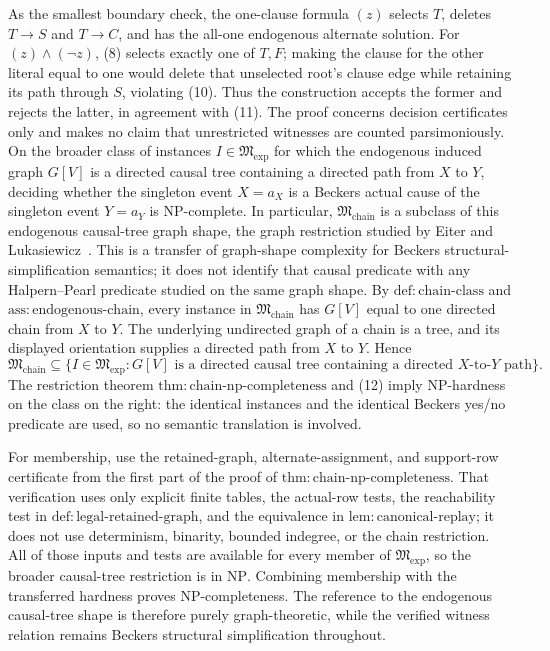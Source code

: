 As the smallest boundary check, the one-clause formula \((z)\) selects \(T\), deletes \(T\to S\) and \(T\to C\), and has the all-one endogenous alternate solution.  For \((z)\wedge(\neg z)\), (8) selects exactly one of \(T,F\); making the clause for the other literal equal to one would delete that unselected root's clause edge while retaining its path through \(S\), violating (10).  Thus the construction accepts the former and rejects the latter, in agreement with (11).  The proof concerns decision certificates only and makes no claim that unrestricted witnesses are counted parsimoniously.
On the broader class of instances \(I\in\mathfrak M_{\mathrm{exp}}\) for which the endogenous induced graph \(G[V]\) is a directed causal tree containing a directed path from \(X\) to \(Y\), deciding whether the singleton event \(X=a_X\) is a Beckers actual cause of the singleton event \(Y=a_Y\) is \(\mathrm{NP}\)-complete.  In particular, \(\mathfrak M_{\mathrm{chain}}\) is a subclass of this endogenous causal-tree graph shape, the graph restriction studied by Eiter and Lukasiewicz~\cite{EiterLukasiewicz2006Tractable}.  This is a transfer of graph-shape complexity for Beckers structural-simplification semantics; it does not identify that causal predicate with any Halpern--Pearl predicate studied on the same graph shape.
By \(\mathrm{def:chain\mbox{-}class}\) and \(\mathrm{ass:endogenous\mbox{-}chain}\), every instance in \(\mathfrak M_{\mathrm{chain}}\) has \(G[V]\) equal to one directed chain from \(X\) to \(Y\).  The underlying undirected graph of a chain is a tree, and its displayed orientation supplies a directed path from \(X\) to \(Y\).  Hence
\[
 \mathfrak M_{\mathrm{chain}}
 \subseteq
 \{I\in\mathfrak M_{\mathrm{exp}}:G[V]\text{ is a directed causal tree containing a directed \(X\)-to-\(Y\) path}\}. \tag{12}
\]
The restriction theorem \(\mathrm{thm:chain\mbox{-}np\mbox{-}completeness}\) and (12) imply \(\mathrm{NP}\)-hardness on the class on the right: the identical instances and the identical Beckers yes/no predicate are used, so no semantic translation is involved.

For membership, use the retained-graph, alternate-assignment, and support-row certificate from the first part of the proof of \(\mathrm{thm:chain\mbox{-}np\mbox{-}completeness}\).  That verification uses only explicit finite tables, the actual-row tests, the reachability test in \(\mathrm{def:legal\mbox{-}retained\mbox{-}graph}\), and the equivalence in \(\mathrm{lem:canonical\mbox{-}replay}\); it does not use determinism, binarity, bounded indegree, or the chain restriction.  All of those inputs and tests are available for every member of \(\mathfrak M_{\mathrm{exp}}\), so the broader causal-tree restriction is in \(\mathrm{NP}\).  Combining membership with the transferred hardness proves \(\mathrm{NP}\)-completeness.  The reference to the endogenous causal-tree shape is therefore purely graph-theoretic, while the verified witness relation remains Beckers structural simplification throughout.
